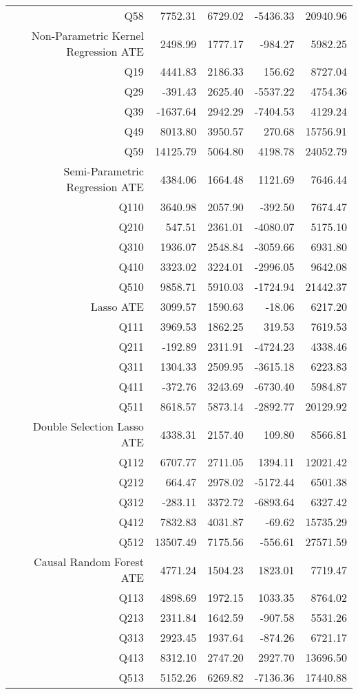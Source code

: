 \begin{table}[ht]
\begin{tabular}{rrrrr}
  Q58 & 7752.31 & 6729.02 & -5436.33 & 20940.96 \\ 
  Non-Parametric Kernel Regression ATE & 2498.99 & 1777.17 & -984.27 & 5982.25 \\ 
  Q19 & 4441.83 & 2186.33 & 156.62 & 8727.04 \\ 
  Q29 & -391.43 & 2625.40 & -5537.22 & 4754.36 \\ 
  Q39 & -1637.64 & 2942.29 & -7404.53 & 4129.24 \\ 
  Q49 & 8013.80 & 3950.57 & 270.68 & 15756.91 \\ 
  Q59 & 14125.79 & 5064.80 & 4198.78 & 24052.79 \\ 
  Semi-Parametric Regression ATE & 4384.06 & 1664.48 & 1121.69 & 7646.44 \\ 
  Q110 & 3640.98 & 2057.90 & -392.50 & 7674.47 \\ 
  Q210 & 547.51 & 2361.01 & -4080.07 & 5175.10 \\ 
  Q310 & 1936.07 & 2548.84 & -3059.66 & 6931.80 \\ 
  Q410 & 3323.02 & 3224.01 & -2996.05 & 9642.08 \\ 
  Q510 & 9858.71 & 5910.03 & -1724.94 & 21442.37 \\ 
  Lasso ATE & 3099.57 & 1590.63 & -18.06 & 6217.20 \\ 
  Q111 & 3969.53 & 1862.25 & 319.53 & 7619.53 \\ 
  Q211 & -192.89 & 2311.91 & -4724.23 & 4338.46 \\ 
  Q311 & 1304.33 & 2509.95 & -3615.18 & 6223.83 \\ 
  Q411 & -372.76 & 3243.69 & -6730.40 & 5984.87 \\ 
  Q511 & 8618.57 & 5873.14 & -2892.77 & 20129.92 \\ 
  Double Selection Lasso ATE & 4338.31 & 2157.40 & 109.80 & 8566.81 \\ 
  Q112 & 6707.77 & 2711.05 & 1394.11 & 12021.42 \\ 
  Q212 & 664.47 & 2978.02 & -5172.44 & 6501.38 \\ 
  Q312 & -283.11 & 3372.72 & -6893.64 & 6327.42 \\ 
  Q412 & 7832.83 & 4031.87 & -69.62 & 15735.29 \\ 
  Q512 & 13507.49 & 7175.56 & -556.61 & 27571.59 \\ 
  Causal Random Forest ATE & 4771.24 & 1504.23 & 1823.01 & 7719.47 \\ 
  Q113 & 4898.69 & 1972.15 & 1033.35 & 8764.02 \\ 
  Q213 & 2311.84 & 1642.59 & -907.58 & 5531.26 \\ 
  Q313 & 2923.45 & 1937.64 & -874.26 & 6721.17 \\ 
  Q413 & 8312.10 & 2747.20 & 2927.70 & 13696.50 \\ 
  Q513 & 5152.26 & 6269.82 & -7136.36 & 17440.88 \\ 
   \hline
\end{tabular}
\end{table}
